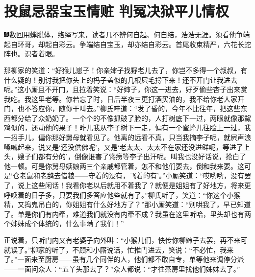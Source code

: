 

\chapter{投鼠忌器宝玉情赃 判冤决狱平儿情权}

{\includegraphics[width=3mm]{../Images/00005}数回用蝉脱体，络绎写来，读者几不辨何自起、何自结，浩浩无涯。须看他争端起自环哥，却起自彩云。争端结自宝玉，却亦结自彩云。首尾收束精严，六花长蛇阵也。识者着眼。}

那柳家的笑道：``好猴儿崽子！你亲婶子找野老儿去了，你岂不多得一个叔叔，有什么疑的！别讨我把你头上的杩子盖似的几根屄毛撏下来！还不开门让我进去呢。''这小厮且不开门，且拉着笑说：``好婶子，你这一进去，好歹偷些杏子出来赏我吃。我这里老等。你若忘了时，日后半夜三更打酒买油的，我不给你老人家开门，也不答应你，随你干叫去。''柳氏啐道：``发了昏的，今年不比往年，把这些东西都分给了众奶奶了。一个个的不像抓破了脸的，人打树底下一过，两眼就像那黧鸡似的，还动他的果子！昨儿我从李子树下一走，偏有一个蜜蜂儿往脸上一过，我一招手儿，偏你那好舅母就看见了。他离的远看不真，只当我摘李子呢，就屄声浪嗓喊起来，说又是`还没供佛呢'，又是`老太太、太太不在家还没进鲜呢，等进了上头，嫂子们都有分的'，倒像谁害了馋痨等李子出汗呢。叫我也没好话说，抢白了他一顿。可是你舅母姨娘两三个亲戚都管着，怎不和他们要去，倒和我来要。这可是`仓老鼠和老鸹去借粮------守着的没有，飞着的有'。''小厮笑道：``哎哟哟，没有罢了，说上这些闲话！我看你老以后就用不着我了？就便是姐姐有了好地方，将来更呼唤着的日子多，只要我们多答应他些就有了。''柳氏听了，笑道：``你这个小猴精，又捣鬼吊白的，你姐姐有什么好地方了？''那小厮笑道：``别哄我了，早已知道了。单是你们有内牵，难道我们就没有内牵不成？我虽在这里听哈，里头却也有两个姊妹成个体统的，什么事瞒了我们！''

正说着，只听门内又有老婆子向外叫：``小猴儿们，快传你柳婶子去罢，再不来可就误了。''柳家的听了，不顾和小厮说话，忙推门进去，笑说：``不必忙，我来了。''一面来至厨房------虽有几个同伴的人，他们都不敢自专，单等他来调停分派------一面问众人：``五丫头那去了？''众人都说：``才往茶房里找他们姊妹去了。''

